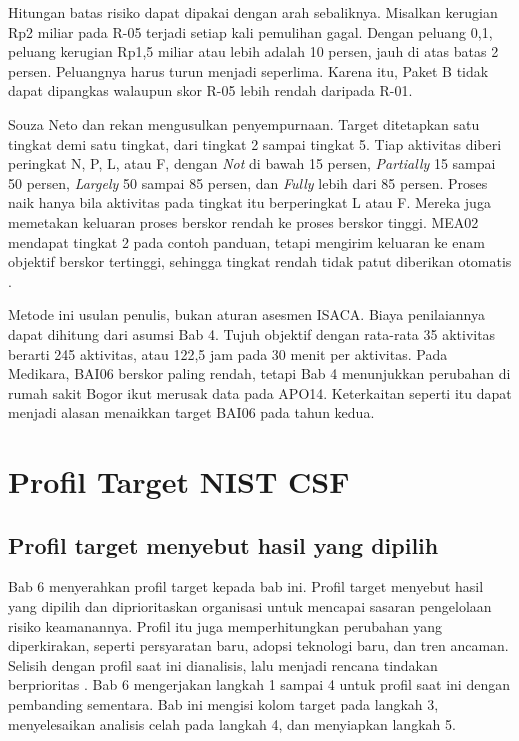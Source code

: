 Hitungan batas risiko dapat dipakai dengan arah sebaliknya. Misalkan kerugian Rp2 miliar pada
R-05 terjadi setiap kali pemulihan gagal. Dengan peluang 0,1, peluang kerugian Rp1,5 miliar atau
lebih adalah 10 persen, jauh di atas batas 2 persen. Peluangnya harus turun menjadi seperlima.
Karena itu, Paket B tidak dapat dipangkas walaupun skor R-05 lebih rendah daripada R-01.

\begin{pendalaman}
Souza Neto dan rekan mengusulkan penyempurnaan. Target ditetapkan satu tingkat demi satu tingkat,
dari tingkat 2 sampai tingkat 5. Tiap aktivitas diberi peringkat N, P, L, atau F, dengan
\textit{Not} di bawah 15 persen, \textit{Partially} 15 sampai 50 persen, \textit{Largely} 50
sampai 85 persen, dan \textit{Fully} lebih dari 85 persen. Proses naik hanya bila aktivitas pada
tingkat itu berperingkat L atau F. Mereka juga memetakan keluaran proses berskor rendah ke proses
berskor tinggi. MEA02 mendapat tingkat 2 pada contoh panduan, tetapi mengirim keluaran ke enam
objektif berskor tertinggi, sehingga tingkat rendah tidak patut diberikan otomatis
\cite{c04-kapabilitas}.

Metode ini usulan penulis, bukan aturan asesmen ISACA. Biaya penilaiannya dapat dihitung dari
asumsi Bab 4. Tujuh objektif dengan rata-rata 35 aktivitas berarti 245 aktivitas, atau 122,5 jam
pada 30 menit per aktivitas. Pada Medikara, BAI06 berskor paling rendah, tetapi Bab 4 menunjukkan
perubahan di rumah sakit Bogor ikut merusak data pada APO14. Keterkaitan seperti itu dapat
menjadi alasan menaikkan target BAI06 pada tahun kedua.
\end{pendalaman}

\section{Profil Target NIST CSF}

\subsection*{Profil target menyebut hasil yang dipilih}

Bab 6 menyerahkan profil target kepada bab ini. Profil target menyebut hasil yang dipilih dan
diprioritaskan organisasi untuk mencapai sasaran pengelolaan risiko keamanannya. Profil itu juga
memperhitungkan perubahan yang diperkirakan, seperti persyaratan baru, adopsi teknologi baru,
dan tren ancaman. Selisih dengan profil saat ini dianalisis, lalu menjadi rencana tindakan
berprioritas \cite{nistcsf2}. Bab 6 mengerjakan langkah 1 sampai 4 untuk profil
saat ini dengan pembanding sementara. Bab ini mengisi kolom target pada langkah 3, menyelesaikan
analisis celah pada langkah 4, dan menyiapkan langkah 5.

